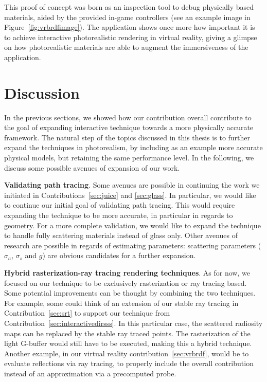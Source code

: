 This proof of concept was born as an inspection tool to debug physically based materials, aided by the provided in-game controllers (see an example image in Figure~\ref{fig:vrbrdfimage}). The application shows once more how important it is to achieve interactive photorealistic rendering in virtual reality, giving a glimpse on how photorealistic materials are able to augment the immersiveness of the application. 

\section{Discussion}
In the previous sections, we showed how our contribution overall contribute to the goal of expanding interactive technique towards a more physically accurate framework. The natural step of the topics discussed in this thesis is to further expand the techniques in photorealism, by including as an example more accurate physical models, but retaining the same performance level. In the following, we discuss some possible avenues of expansion of our work.

\textbf{Validating path tracing}. Some avenues are possible in continuing the work we initiated in Contributions~\ref{sec:juice} and \ref{sec:glass}. In particular, we would like to continue our initial goal of validating path tracing. This would require expanding the technique to be more accurate, in particular in regards to geometry. For a more complete validation, we would like to expand the technique to handle fully scattering materials instead of glass only. Other avenues of research are possible in regards of estimating parameters: scattering parameters ($\sigma_a$, $\sigma_s$ and $g$) are obvious candidates for a further expansion.

\textbf{Hybrid rasterization-ray tracing rendering techniques}. As for now, we focused on our technique to be exclusively rasterization or ray tracing based. Some potential improvements can be thought by combining the two techniques. For example, some could think of an extension of our stable ray tracing in Contribution~\ref{sec:srt} to support our technique from Contribution~\ref{sec:interactivedirsss}. In this particular case, the scattered radiosity maps can be replaced by the stable ray traced points. The rasterization of the light G-buffer would still have to be executed, making this a hybrid technique.  Another example, in our virtual reality contribution~\ref{sec:vrbrdf}, would be to evaluate reflections via ray tracing, to properly include the overall contribution instead of an approximation via a precomputed probe.

